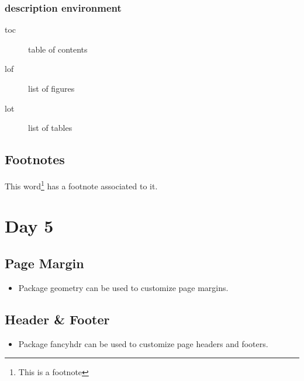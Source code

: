 \documentclass[a4paper,12pt]{article}
\begin{document}
\subsubsection*{description environment}
	\begin{description}
		\item[toc] table of contents
		\item[lof] list of figures
		\item[lot] list of tables
	\end{description}

\subsection{Footnotes}
This word\footnote{This is a footnote} has a footnote associated to it.

\section{Day 5}

\subsection{Page Margin}
\begin{itemize}
	\item Package geometry can be used to customize page margins.
\end{itemize}

\subsection{Header \& Footer}
\begin{itemize}
	\item Package fancyhdr can be used to customize page headers and footers.
\end{itemize}

%
%
\end{document}
